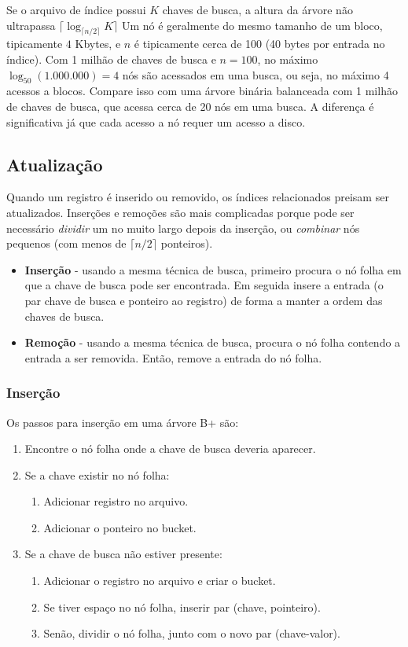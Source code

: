 Se o arquivo de índice possui $K$ chaves de busca, a altura da árvore não
ultrapassa $\lceil \log_{\lceil n/2 \rceil} K \rceil$
Um nó é geralmente do mesmo tamanho de um bloco, tipicamente $4$ Kbytes, e 
$n$ é tipicamente cerca de 100 (40 bytes por entrada no índice).
Com 1 milhão de chaves de busca e $n= 100$, no máximo $\log_{50}(1.000.000) = 4$
nós são acessados em uma busca, ou seja, no máximo 4 acessos a blocos.
Compare isso com uma árvore binária balanceada com 1 milhão de chaves de busca,
que acessa cerca de 20 nós em uma busca.
A diferença é significativa já que cada acesso a nó requer um acesso a disco.

\subsection{Atualização}

Quando um registro é inserido ou removido, os índices relacionados preisam ser
atualizados.
Inserções e remoções são mais complicadas porque pode ser necessário
\emph{dividir} um no muito largo depois da inserção, ou \emph{combinar} nós
pequenos (com menos de $\lceil n/2 \rceil$ ponteiros).

\begin{itemize}
\item \textbf{Inserção} - usando a mesma técnica de busca, primeiro procura
o nó folha em que a chave de busca pode ser encontrada.  Em seguida insere a
entrada (o par chave de busca e ponteiro ao registro) de forma a manter a ordem
das chaves de busca.

\item \textbf{Remoção} - usando a mesma técnica de busca, procura o nó folha contendo 
a entrada a ser removida. 
Então, remove a entrada do nó folha. 
\end{itemize}

\subsubsection{Inserção}

Os passos para inserção em uma árvore B+ são:
\begin{enumerate}
\item Encontre o nó folha onde a chave de busca deveria aparecer.
\item Se a chave existir no nó folha:
	\begin{enumerate}
	\item Adicionar registro no arquivo.
	\item Adicionar o ponteiro no bucket.
	\end{enumerate}
\item Se a chave de busca não estiver presente:
	\begin{enumerate}
	\item Adicionar o registro no arquivo e criar o bucket.
	\item Se tiver espaço no nó folha, inserir par (chave, pointeiro).
	\item Senão, dividir o nó folha, junto com o novo par (chave-valor).
	\end{enumerate}
\end{enumerate}

